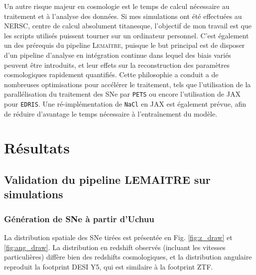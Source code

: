\documentclass{book}
\def\lemaitre{\textsc{Lemaître}\xspace}
\def\pets{\texttt{PETS}\xspace}
\def\nacl{\texttt{NaCl}\xspace}
\def\edris{\texttt{EDRIS}\xspace}
\begin{document}
Un autre risque majeur en cosmologie est le temps de calcul nécessaire au traitement et à l'analyse des données. Si mes simulations ont été effectuées au NERSC, centre de calcul absolument titanesque, l'objectif de mon travail est que les scripts utilisés puissent tourner sur un ordinateur personnel. C'est également un des prérequis du pipeline \lemaitre, puisque le but principal est de disposer d'un pipeline d'analyse en intégration continue dans lequel des biais variés peuvent être introduits, et leur effets sur la reconstruction des paramètres cosmologiques rapidement quantifiés. Cette philosophie a conduit a de nombreuses optimisations pour accélérer le traitement, tels que l'utilisation de la parallélisation du traitement des SNe par \pets ou encore l'utilisation de JAX pour \edris. Une ré-implémentation de \nacl en JAX est également prévue, afin de réduire d'avantage le temps nécessaire à l'entraînement du modèle.


\chapter{Résultats}

\section{Validation du pipeline LEMAITRE sur simulations}

\subsection{Génération de SNe à partir d'Uchuu}

La distribution spatiale des SNe tirées est présentée en Fig. \ref{fig:z_draw} et \ref{fig:ang_draw}. La distribution en redshift observés (incluant les vitesses particulières) diffère bien des redshifts cosmologiques, et la distribution angulaire reproduit la footprint DESI Y5, qui est similaire à la footprint ZTF.
\end{document}
